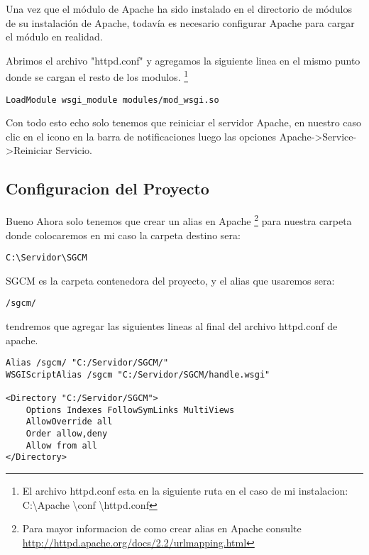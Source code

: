 Una vez que el módulo de Apache ha sido instalado en el directorio de módulos
de su instalación de Apache, todavía es necesario configurar Apache para cargar
el módulo en realidad.

Abrimos el archivo "httpd.conf" y agregamos la siguiente linea en el mismo
punto donde se cargan el resto de los modulos. \footnote {El archivo httpd.conf
esta en la siguiente ruta en el caso de mi instalacion:
C:\textbackslash Apache \textbackslash conf \textbackslash httpd.conf}

\begin{lstlisting}[style=consola]
    LoadModule wsgi_module modules/mod_wsgi.so
\end{lstlisting}
\vspace{0.1cm}

Con todo esto echo solo tenemos que reiniciar el servidor Apache, en nuestro
 caso clic en el icono en la barra de notificaciones luego las opciones
 Apache->Service->Reiniciar Servicio. 

\subsection{Configuracion del Proyecto}

Bueno Ahora solo tenemos que crear un alias en Apache \footnote{Para mayor
informacion de como crear alias en Apache consulte
\url{http://httpd.apache.org/docs/2.2/urlmapping.html}} para nuestra carpeta
donde colocaremos en mi caso la carpeta destino sera:

\begin{lstlisting}[style=consola]
	C:\Servidor\SGCM
\end{lstlisting}
\vspace{0.1cm}

SGCM es la carpeta contenedora del proyecto, y el alias que usaremos sera:

\begin{lstlisting}[style=consola]
	/sgcm/ 
\end{lstlisting}
\vspace{0.1cm}

tendremos que agregar las siguientes lineas al final del archivo
httpd.conf de apache.

\begin{lstlisting}[style=HTML]
Alias /sgcm/ "C:/Servidor/SGCM/" 
WSGIScriptAlias /sgcm "C:/Servidor/SGCM/handle.wsgi" 

<Directory "C:/Servidor/SGCM">
    Options Indexes FollowSymLinks MultiViews
    AllowOverride all
    Order allow,deny
    Allow from all
</Directory>
\end{lstlisting}
\vspace{0.1cm}



